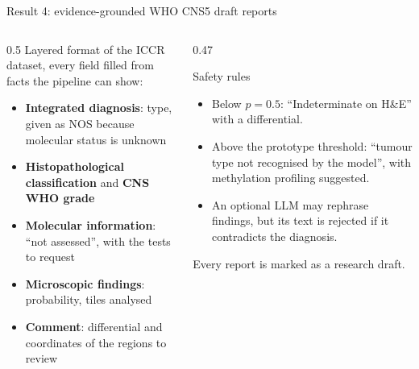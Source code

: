 \documentclass[aspectratio=169,11pt]{beamer}
\newcommand{\aside}[1]{{\color{muted}\small #1}}
\begin{document}
\begin{frame}{Result 4: evidence-grounded WHO CNS5 draft reports}
  \begin{columns}[T]
    \begin{column}{0.5\textwidth}
      Layered format of the ICCR dataset, every field filled from facts the pipeline can show:
      \begin{itemize}
        \item \textbf{Integrated diagnosis}: type, given as NOS because molecular status is unknown
        \item \textbf{Histopathological classification} and \textbf{CNS WHO grade}
        \item \textbf{Molecular information}: ``not assessed'', with the tests to request
        \item \textbf{Microscopic findings}: probability, tiles analysed
        \item \textbf{Comment}: differential and coordinates of the regions to review
      \end{itemize}
    \end{column}
    \begin{column}{0.47\textwidth}
      \begin{block}{Safety rules}
        \begin{itemize}
          \item Below $p = 0.5$: ``Indeterminate on H\&E'' with a differential.
          \item Above the prototype threshold: ``tumour type not recognised by the model'', with methylation profiling suggested.
          \item An optional LLM may rephrase findings, but its text is rejected if it contradicts the diagnosis.
        \end{itemize}
      \end{block}
      \aside{Every report is marked as a research draft.}
    \end{column}
  \end{columns}
\end{frame}
\end{document}

